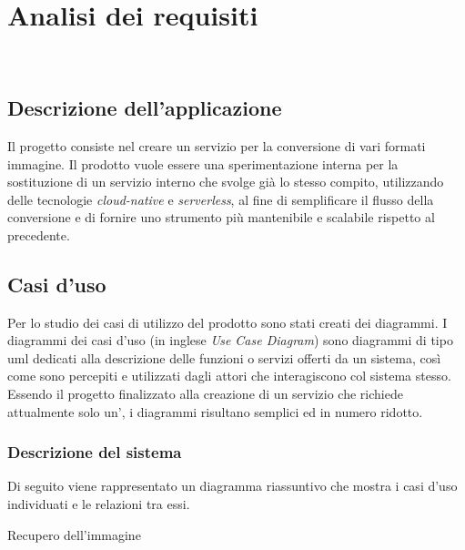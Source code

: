 \chapter{Analisi dei requisiti}
\label{cap:analisi-requisiti}

\\

\section{Descrizione dell'applicazione}
Il progetto consiste nel creare un servizio per la
conversione di vari formati immagine. Il prodotto vuole essere una
sperimentazione interna per la sostituzione di un servizio interno che svolge
già lo stesso compito, utilizzando delle tecnologie \emph{cloud-native} e
\emph{serverless}, al fine di semplificare il flusso della conversione e di
fornire uno strumento più mantenibile e scalabile rispetto al precedente.\\


\section{Casi d'uso}

Per lo studio dei casi di utilizzo del prodotto sono stati creati dei diagrammi.
I diagrammi dei casi d'uso (in inglese \emph{Use Case Diagram}) sono diagrammi di tipo \gls{uml} dedicati
alla descrizione delle funzioni o servizi offerti da un sistema, così come sono
percepiti e utilizzati dagli attori che interagiscono col sistema stesso.
Essendo il progetto finalizzato alla creazione di un servizio che richiede
attualmente solo un', i diagrammi risultano semplici ed in numero ridotto.

\subsection{Descrizione del sistema}
Di seguito viene rappresentato un diagramma riassuntivo che mostra i casi d'uso
individuati e le relazioni tra essi.

\begin{usecase}{1}{Recupero dell'immagine}
    \label{uc:recupero-immagine}
\end{usecase}

